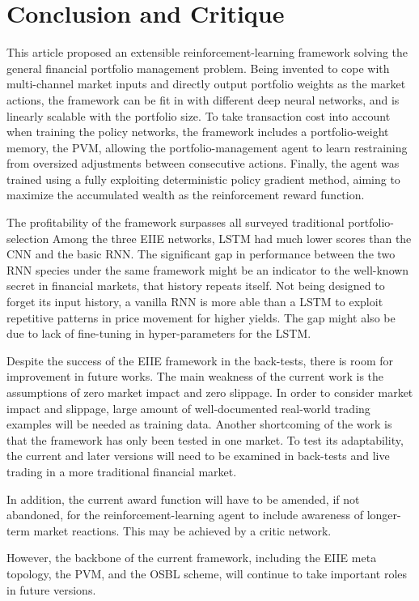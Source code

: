 \documentclass[journal,onecolumn]{IEEEtran}
\begin{document}
\section{Conclusion and Critique}
This article proposed an extensible reinforcement-learning framework solving the general financial portfolio management problem. Being invented to cope with multi-channel market inputs and directly output portfolio weights as the market actions, the framework can be fit in with different deep neural networks, and is linearly scalable with the portfolio size.
To take transaction cost into account when training the policy networks, the framework
includes a portfolio-weight memory, the PVM, allowing the portfolio-management agent to learn restraining from oversized adjustments between consecutive actions. Finally, the agent was trained using a fully exploiting deterministic policy
gradient method, aiming to maximize the accumulated wealth as the reinforcement reward
function.

The profitability of the framework surpasses all surveyed traditional portfolio-selection Among the three EIIE networks, LSTM had much lower scores than the CNN and the basic RNN. The significant gap in performance between the two RNN species under the same framework might be an indicator to the well-known secret in financial markets, that history repeats itself. Not being designed to forget its input history, a vanilla RNN is more able than a LSTM to exploit repetitive patterns in price movement for higher yields. The gap might also be due to lack of fine-tuning in hyper-parameters for the LSTM.


Despite the success of the EIIE framework in the back-tests, there is room for improvement in future works. The main weakness of the current work is the assumptions of zero market impact and zero slippage. In order to consider market impact and slippage, large
amount of well-documented real-world trading examples will be needed as training data. 
Another shortcoming of the work is that the framework has only been tested in one market. To test its adaptability, the current and
later versions will need to be examined in back-tests and live trading in a more traditional financial market.

In addition, the current award function will have to be amended, if not abandoned, for the reinforcement-learning agent to include awareness of longer-term market reactions. This may be achieved by a critic network.

However, the backbone of the current framework, including the EIIE meta topology, the PVM, and the OSBL scheme,
will continue to take important roles in future versions.
\end{document}
